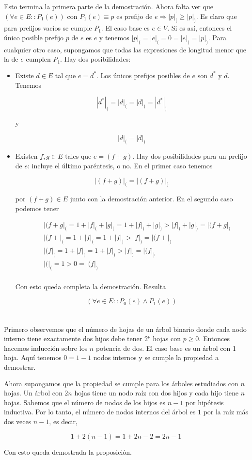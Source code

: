 \documentclass{article}
\begin{document}
Esto termina la primera parte de la demostración. Ahora falta ver que
$(\forall e \in E :: P_1(e))$
con
$P_1(e) \equiv p \text{ es prefijo de } e \Rightarrow |p|_( \geq |p|_)$.
Es claro que para prefijos vacíos se cumple $P_1$.
El caso base es $e \in V$. Si es así, entonces el único posible prefijo $p$ de
$e$ es $e$ y tenemos $|p|_( = |e|_( = 0 = |e|_) = |p|_)$. Para cualquier otro
caso, supongamos que todas las expresiones de longitud menor que la de $e$
cumplen $P_1$. Hay dos posibilidades:

\begin{itemize}

\item Existe $d \in E$ tal que $e = d^*$. Los únicos prefijos posibles de $e$
son $d^*$ y $d$. Tenemos

$$|d^*|_( = |d|_( = |d|_) = |d^*|_)$$

y

$$|d|_( = |d|_)$$

\item Existen $f,g \in E$ tales que $e = (f+g)$. Hay dos posibilidades para un
prefijo de $e$: incluye el último paréntesis, o no. En el primer caso tenemos

$$
|(f+g)|_( = |(f+g)|_)
$$

por $(f+g) \in E$ junto con la demostración anterior. En el segundo caso podemos
tener

\begin{eqnarray*}
& & |(f+g|_( = 1 + |f|_( + |g|_( = 1 + |f|_) + |g|_) > |f|_) + |g|_) = |(f+g|_) \\
& & |(f+|_( = 1 + |f|_( = 1 + |f|_) > |f|_) = |(f+|_) \\
& & |(f|_( = 1 + |f|_( = 1 + |f|_) > |f|_) = |(f|_) \\
& & |(|_( = 1 > 0 = |(f|_) \\
\end{eqnarray*}

Con esto queda completa la demostración. Resulta

$$(\forall e \in E :: P_0(e) \wedge P_1(e))$$

\end{itemize}

\section{}

Primero observemos que el número de hojas de un árbol binario donde cada nodo
interno tiene exactamente dos hijos debe tener $2^p$ hojas con $p \geq 0$.
Entonces hacemos inducción sobre los $n$ potencia de dos. El caso base es un
árbol con 1 hoja. Aquí tenemos $0 = 1 - 1$ nodos internos y se cumple la
propiedad a demostrar.

Ahora supongamos que la propiedad se cumple para los
árboles estudiados con $n$ hojas. Un árbol con $2n$ hojas tiene un nodo raíz
con dos hijos y cada hijo tiene $n$ hojas. Sabemos que el número de nodos de los
hijos es $n-1$ por hipótesis inductiva. Por lo tanto, el número de
nodos internos del árbol es $1$ por la raíz más dos veces $n-1$, es decir,

$$
1+2(n-1) = 1 + 2n - 2 = 2n - 1
$$

Con esto queda demostrada la proposición.
\end{document}
